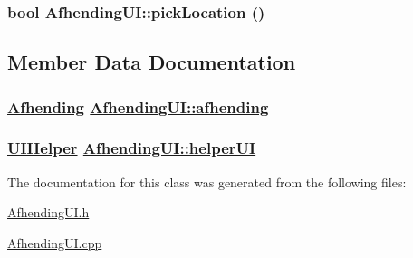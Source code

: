 \hypertarget{class_afhending_u_i_74d0d6b7d7493e8a9703bc8fbeb79f2e}{
\subsubsection[pickLocation]{\setlength{\rightskip}{0pt plus 5cm}bool Afhending\-UI::pick\-Location ()}}
\label{class_afhending_u_i_74d0d6b7d7493e8a9703bc8fbeb79f2e}




\subsection{Member Data Documentation}
\hypertarget{class_afhending_u_i_6d54613ddac2c68ed16224a0ac770eb5}{
\subsubsection[afhending]{\setlength{\rightskip}{0pt plus 5cm}\hyperlink{class_afhending}{Afhending} \hyperlink{class_afhending_u_i_6d54613ddac2c68ed16224a0ac770eb5}{Afhending\-UI::afhending}}}
\label{class_afhending_u_i_6d54613ddac2c68ed16224a0ac770eb5}


\hypertarget{class_afhending_u_i_165ca02db075e280199e0970e3465900}{
\subsubsection[helperUI]{\setlength{\rightskip}{0pt plus 5cm}\hyperlink{class_u_i_helper}{UIHelper} \hyperlink{class_afhending_u_i_165ca02db075e280199e0970e3465900}{Afhending\-UI::helper\-UI}}}
\label{class_afhending_u_i_165ca02db075e280199e0970e3465900}




The documentation for this class was generated from the following files:\begin{CompactItemize}
\item 
\hyperlink{_afhending_u_i_8h}{Afhending\-UI.h}\item 
\hyperlink{_afhending_u_i_8cpp}{Afhending\-UI.cpp}\end{CompactItemize}
